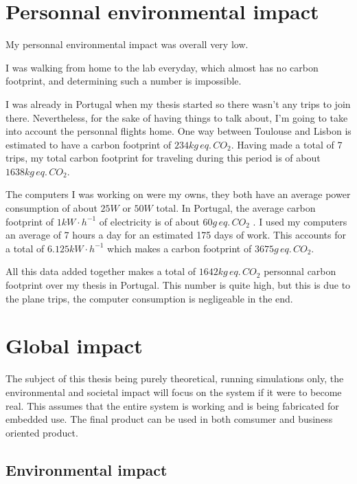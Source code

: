 \label{cap:rse}

\section{Personnal environmental impact}

My personnal environmental impact was overall very low.

I was walking from home to the lab everyday, which almost has no carbon footprint, and determining such a number is impossible.

I was already in Portugal when my thesis started so there wasn't any trips to join there. Nevertheless, for the sake of having things to talk about, I'm going to take into account the personnal flights home. One way between Toulouse and Lisbon is estimated to have a carbon footprint of $234 kg\, eq.\,CO_2$. Having made a total of 7 trips, my total carbon footprint for traveling during this period is of about $1638 kg\, eq.\, CO_2$.

The computers I was working on were my owns, they both have an average power consumption of about $25W$ or $50W$ total. In Portugal, the average carbon footprint of $1kW\cdot h^{-1}$ of electricity is of about $60g\,eq.\,CO_2$ \cite{portugalElec}. I used my computers an average of 7 hours a day for an estimated 175 days of work. This accounts for a total of $6.125kW\cdot h^{-1}$ which makes a carbon footprint of $3 675g\,eq.\,CO_2$.

All this data added together makes a total of $1642kg\,eq.\,CO_2$ personnal carbon footprint over my thesis in Portugal. This number is quite high, but this is due to the plane trips, the computer consumption is negligeable in the end.

\section{Global impact}

The subject of this thesis being purely theoretical, running simulations only, the environmental and societal impact will focus on the system if it were to become real. This assumes that the entire system is working and is being fabricated for embedded use. The final product can be used in both comsumer and business oriented product.

\subsection{Environmental impact}\label{subsec:envImp}

